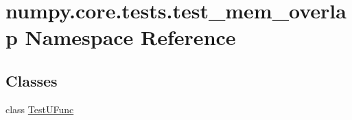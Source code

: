 \hypertarget{namespacenumpy_1_1core_1_1tests_1_1test__mem__overlap}{}\section{numpy.\+core.\+tests.\+test\+\_\+mem\+\_\+overlap Namespace Reference}
\label{namespacenumpy_1_1core_1_1tests_1_1test__mem__overlap}
\subsection*{Classes}
\begin{DoxyCompactItemize}
\item 
class \hyperlink{classnumpy_1_1core_1_1tests_1_1test__mem__overlap_1_1TestUFunc}{Test\+U\+Func}
\end{DoxyCompactItemize}
